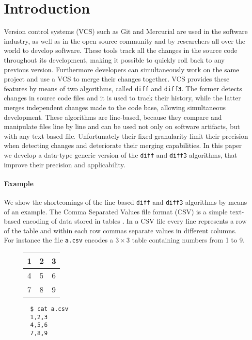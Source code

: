 \documentclass[preprint]{sigplanconf}
\begin{document}
\section{Introduction}
Version control systems (VCS) such as Git \cite{Git} and Mercurial \cite{Mercurial}
are used in the software industry, as well as in the open source community and by researchers all over the world to develop software.
These tools track all the changes in the source code throughout its development, making it possible to quickly roll back to any previous version. Furthermore developers can simultaneously work on the same project and use a VCS to merge their changes together.
VCS provides these features by means of two algorithms, called \texttt{diff} and \texttt{diff3}.
The former detects changes in source code files and it is used to track their history, while the latter merges independent changes made to the code base, allowing simultaneous development.
These algorithms are line-based, because they compare and manipulate files line by line and can be used not only on software artifacts, but with any text-based file. 
Unfortunately their fixed-granularity limit their precision when detecting changes and deteriorate their merging capabilities. In this paper we develop a data-type generic version of the \texttt{diff} and \texttt{diff3} algorithms, that improve their precision and applicability.

\paragraph{Example}
We show the shortcomings of the line-based \texttt{diff} and \texttt{diff3} algorithms by means of an example.
The Comma Separated Values file format (CSV) is a simple text-based encoding of data stored in tables \cite{csv}.
In a CSV file every line represents a row of the table and within each row commas separate values in different columns.
For instance the file \texttt{a.csv} encodes a $3 \times 3$ table containing numbers from 1 to 9.
\begin{figure}[!h]
\centering
\begin{minipage}{.25\textwidth}
  \centering
  \begin{tabular}{ | c | c | c | }
    \hline
    1 & 2 & 3 \\ \hline
    4 & 5 & 6 \\ \hline
    7 & 8 & 9  \\ \hline
  \end{tabular}
\end{minipage}%
\begin{minipage}{.25\textwidth}
  \centering
  \begin{verbatim}
  $ cat a.csv
  1,2,3
  4,5,6
  7,8,9
  \end{verbatim}
\end{minipage}%
\end{figure}
\end{document}
